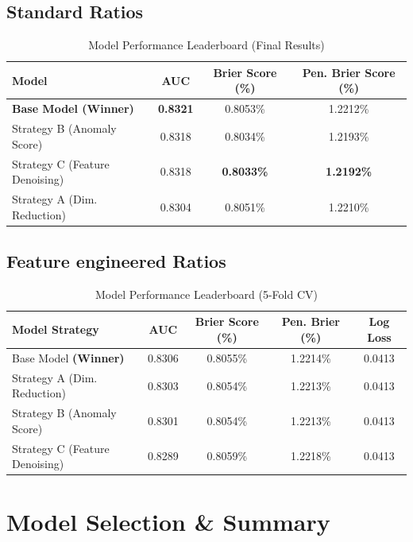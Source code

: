 \documentclass{report}\usepackage[]{graphicx}\usepackage[]{xcolor}
\begin{document}
\subsection{Standard Ratios}

\begin{table}[h]
    \centering
    \caption{Model Performance Leaderboard (Final Results)}
    \label{tab:leaderboard_final}
    \begin{tabular}{lccc}
        \hline
        \textbf{Model} & \textbf{AUC} & \textbf{Brier Score (\%)} & \textbf{Pen. Brier Score (\%)} \\
        \hline
        \textbf{Base Model (Winner)} & \textbf{0.8321} & 0.8053\% & 1.2212\% \\
        Strategy B (Anomaly Score) & 0.8318 & 0.8034\% & 1.2193\% \\
        Strategy C (Feature Denoising) & 0.8318 & \textbf{0.8033\%} & \textbf{1.2192\%} \\
        Strategy A (Dim. Reduction) & 0.8304 & 0.8051\% & 1.2210\% \\
        \hline
    \end{tabular}
\end{table}

\subsection{Feature engineered Ratios}

\begin{table}[H]
\centering
\caption{Model Performance Leaderboard (5-Fold CV)}
\label{tab:leaderboard}
\begin{tabular}{lcccc}
\toprule
\textbf{Model Strategy} & \textbf{AUC} & \textbf{Brier Score (\%)} & \textbf{Pen. Brier (\%)} & \textbf{Log Loss} \\ 
\midrule
Base Model \textbf{(Winner)}    & 0.8306 & 0.8055\% & 1.2214\% & 0.0413 \\
Strategy A (Dim. Reduction)     & 0.8303 & 0.8054\% & 1.2213\% & 0.0413 \\
Strategy B (Anomaly Score)      & 0.8301 & 0.8054\% & 1.2213\% & 0.0413 \\
Strategy C (Feature Denoising)  & 0.8289 & 0.8059\% & 1.2218\% & 0.0413 \\
\bottomrule
\end{tabular}
\end{table}


\section{Model Selection \& Summary}
\end{document}
